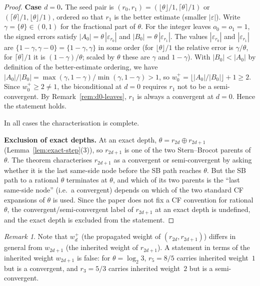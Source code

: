 \documentclass[12pt]{article}
\theoremstyle{definition}
\theoremstyle{remark}
\newtheorem{remark}[theorem]{Remark}
\theoremstyle{plain}
\begin{document}
\begin{proof}
\medskip
\textbf{Case $d = 0$.}
The seed pair is $(r_0, r_1) = (\lfloor\theta\rfloor/1, \lceil\theta\rceil/1)$
or $(\lceil\theta\rceil/1, \lfloor\theta\rfloor/1)$, ordered so that $r_1$ is the
better estimate (smaller $|\varepsilon|$).
Write $\gamma = \{\theta\} \in (0,1)$ for the fractional part of $\theta$.
For the integer leaves $o_0 = o_1 = 1$, the signed errors satisfy
$|A_0| = \theta\,|\varepsilon_{r_0}|$ and $|B_0| = \theta\,|\varepsilon_{r_1}|$.
The values $|\varepsilon_{r_0}|$ and $|\varepsilon_{r_1}|$ are $\{1-\gamma, \gamma-0\} = \{1-\gamma, \gamma\}$
in some order (for $\lfloor\theta\rfloor/1$ the relative error is $\gamma/\theta$,
for $\lceil\theta\rceil/1$ it is $(1-\gamma)/\theta$; scaled by $\theta$ these are $\gamma$ and $1-\gamma$).
With $|B_0| < |A_0|$ by definition of the better-estimate ordering, we have
$|A_0|/|B_0| = \max(\gamma,1-\gamma)/\min(\gamma,1-\gamma) > 1$,
so $w^+_0 = \lfloor|A_0|/|B_0|\rfloor + 1 \ge 2$.
Since $w^+_0 \ge 2 \ne 1$, the biconditional at $d = 0$ requires $r_1$ not to be a
semi-convergent.  By Remark~\ref{rem:d0-leaves}, $r_1$ is always a convergent at $d = 0$.
Hence the statement holds.

\medskip
In all cases the characterisation is complete.

\medskip
\textbf{Exclusion of exact depths.}
At an exact depth, $\theta = r_{2d} \oplus r_{2d+1}$ (Lemma~\ref{lem:exact-step}(3)),
so $r_{2d+1}$ is one of the two Stern--Brocot parents of $\theta$.
The theorem characterises $r_{2d+1}$ as a convergent or semi-convergent by asking
whether it is the last same-side node before the SB path reaches $\theta$.
But the SB path to a rational $\theta$ terminates at $\theta$, and which of its two
parents is the ``last same-side node'' (i.e.\ a convergent) depends on which of the
two standard CF expansions of $\theta$ is used.
Since the paper does not fix a CF convention for rational $\theta$, the
convergent/semi-convergent label of $r_{2d+1}$ at an exact depth is undefined, and
the exact depth is excluded from the statement.
\end{proof}

\begin{remark}
Note that $w^+_d$ (the propagated weight of $(r_{2d}, r_{2d+1})$) differs in
general from $w_{2d+1}$ (the inherited weight of $r_{2d+1}$).
A statement in terms of the inherited weight $w_{2d+1}$ is false: for $\theta = \log_2 3$,
$r_5 = 8/5$ carries inherited weight~$1$ but is a convergent, and $r_3 = 5/3$ carries
inherited weight~$2$ but is a semi-convergent.
\end{remark}
\end{document}
